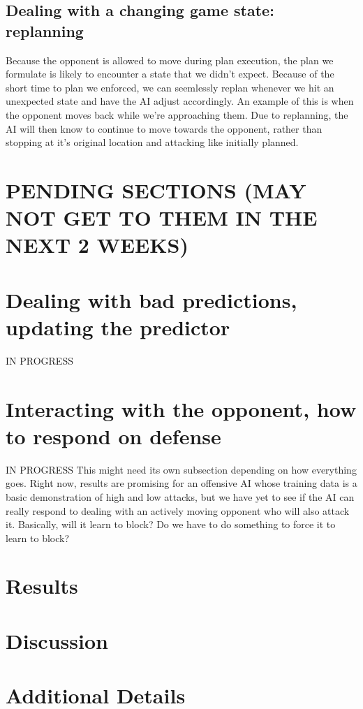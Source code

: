 \subsection{Dealing with a changing game state: replanning}
Because the opponent is allowed to move during plan execution, the plan we formulate is likely to encounter a state that we didn't expect. Because of the short time to plan we enforced, we can seemlessly replan whenever we hit an unexpected state and have the AI adjust accordingly. An example of this is when the opponent moves back while we're approaching them. Due to replanning, the AI will then know to continue to move towards the opponent, rather than stopping at it's original location and attacking like initially planned.


\section{PENDING SECTIONS (MAY NOT GET TO THEM IN THE NEXT 2 WEEKS)}
\section{Dealing with bad predictions, updating the predictor}
IN PROGRESS

\section{Interacting with the opponent, how to respond on defense}
IN PROGRESS
This might need its own subsection depending on how everything goes. Right now, results are promising for an offensive AI whose training data is a basic demonstration of high and low attacks, but we have yet to see if the AI can really respond to dealing with an actively moving opponent who will also attack it. Basically, will it learn to block? Do we have to do something to force it to learn to block?


\section{Results}

\section{Discussion}

\section{Additional Details}

